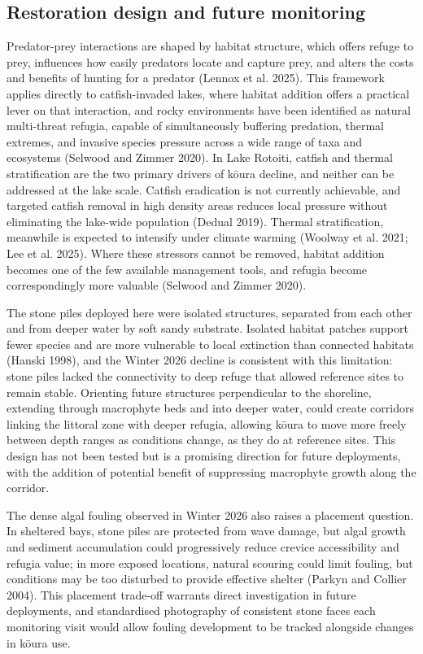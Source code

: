 \documentclass[
  12pt,
  a4paper,
  oneside]{scrbook}
\begin{document}
\subsection{Restoration design and future
monitoring}\label{restoration-design-and-future-monitoring}

Predator-prey interactions are shaped by habitat structure, which offers
refuge to prey, influences how easily predators locate and capture prey,
and alters the costs and benefits of hunting for a predator (Lennox et
al. 2025). This framework applies directly to catfish-invaded lakes,
where habitat addition offers a practical lever on that interaction, and
rocky environments have been identified as natural multi-threat refugia,
capable of simultaneously buffering predation, thermal extremes, and
invasive species pressure across a wide range of taxa and ecosystems
(Selwood and Zimmer 2020). In Lake Rotoiti, catfish and thermal
stratification are the two primary drivers of kōura decline, and neither
can be addressed at the lake scale. Catfish eradication is not currently
achievable, and targeted catfish removal in high density areas reduces
local pressure without eliminating the lake-wide population (Dedual
2019). Thermal stratification, meanwhile is expected to intensify under
climate warming (Woolway et al. 2021; Lee et al. 2025). Where these
stressors cannot be removed, habitat addition becomes one of the few
available management tools, and refugia become correspondingly more
valuable (Selwood and Zimmer 2020).

The stone piles deployed here were isolated structures, separated from
each other and from deeper water by soft sandy substrate. Isolated
habitat patches support fewer species and are more vulnerable to local
extinction than connected habitats (Hanski 1998), and the Winter 2026
decline is consistent with this limitation: stone piles lacked the
connectivity to deep refuge that allowed reference sites to remain
stable. Orienting future structures perpendicular to the shoreline,
extending through macrophyte beds and into deeper water, could create
corridors linking the littoral zone with deeper refugia, allowing kōura
to move more freely between depth ranges as conditions change, as they
do at reference sites. This design has not been tested but is a
promising direction for future deployments, with the addition of
potential benefit of suppressing macrophyte growth along the corridor.

The dense algal fouling observed in Winter 2026 also raises a placement
question. In sheltered bays, stone piles are protected from wave damage,
but algal growth and sediment accumulation could progressively reduce
crevice accessibility and refugia value; in more exposed locations,
natural scouring could limit fouling, but conditions may be too
disturbed to provide effective shelter (Parkyn and Collier 2004). This
placement trade-off warrants direct investigation in future deployments,
and standardised photography of consistent stone faces each monitoring
visit would allow fouling development to be tracked alongside changes in
kōura use.
\end{document}
